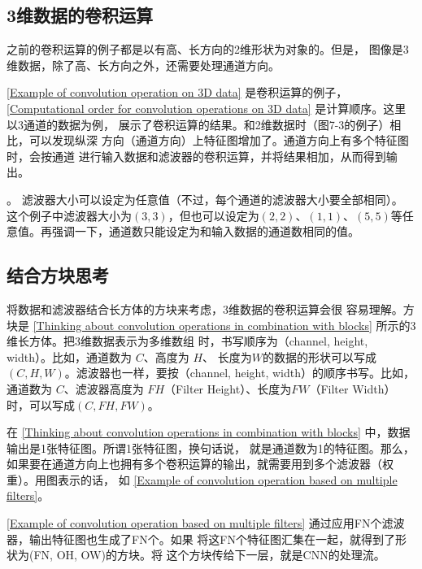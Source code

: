 \subsection{3维数据的卷积运算}
之前的卷积运算的例子都是以有高、长方向的2维形状为对象的。但是，
图像是3维数据，除了高、长方向之外，还需要处理通道方向。

\autoref{Example of convolution operation on 3D data} 是卷积运算的例子，\autoref{Computational order for convolution operations on 3D data} 是计算顺序。这里以3通道的数据为例，
展示了卷积运算的结果。和2维数据时（图7-3的例子）相比，可以发现纵深
方向（通道方向）上特征图增加了。通道方向上有多个特征图时，会按通道
进行输入数据和滤波器的卷积运算，并将结果相加，从而得到输出。


。
滤波器大小可以设定为任意值（不过，每个通道的滤波器大小要全部相同）。
这个例子中滤波器大小为$(3, 3)$，但也可以设定为$(2, 2)$、$(1, 1)$、$(5, 5)$等任
意值。再强调一下，通道数只能设定为和输入数据的通道数相同的值。

\subsection{结合方块思考}
将数据和滤波器结合长方体的方块来考虑，3维数据的卷积运算会很
容易理解。方块是 \autoref{Thinking about convolution operations in combination with blocks} 所示的3维长方体。把3维数据表示为多维数组
时，书写顺序为（channel, height, width）。比如，通道数为 $C$、高度为 $H$、
长度为$W$的数据的形状可以写成$(C, H, W)$。滤波器也一样，要按（channel,
height, width）的顺序书写。比如，通道数为 $C$、滤波器高度为 $FH$（Filter
Height）、长度为$FW$（Filter Width）时，可以写成$(C, FH, FW)$。


在 \autoref{Thinking about convolution operations in combination with blocks} 中，数据输出是1张特征图。所谓1张特征图，换句话说，
就是通道数为1的特征图。那么，如果要在通道方向上也拥有多个卷积运算的输出，就需要用到多个滤波器（权重）。用图表示的话，
如 \autoref{Example of convolution operation based on multiple filters}。


\autoref{Example of convolution operation based on multiple filters} 通过应用FN个滤波器，输出特征图也生成了FN个。如果
将这FN个特征图汇集在一起，就得到了形状为(FN, OH, OW)的方块。将
这个方块传给下一层，就是CNN的处理流。

